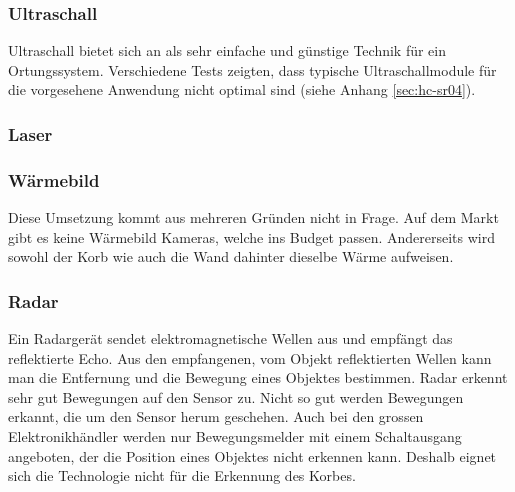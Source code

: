 \subsubsection{Ultraschall}
Ultraschall bietet sich an als sehr einfache und günstige Technik für ein Ortungssystem.
Verschiedene Tests zeigten, dass typische Ultraschallmodule für die vorgesehene Anwendung
nicht optimal sind (siehe Anhang \ref{sec:hc-sr04}).

\subsubsection{Laser}


\subsubsection{Wärmebild}
Diese Umsetzung kommt aus mehreren Gründen nicht in Frage. Auf dem Markt gibt es keine Wärmebild Kameras, welche ins Budget passen. Andererseits wird sowohl der Korb wie auch die Wand dahinter dieselbe Wärme aufweisen.

\subsubsection{Radar}

Ein Radargerät sendet elektromagnetische Wellen aus und empfängt das reflektierte Echo. Aus den empfangenen, vom Objekt reflektierten Wellen kann man die Entfernung und die Bewegung eines Objektes bestimmen. Radar erkennt sehr gut Bewegungen auf den Sensor zu. Nicht so gut werden Bewegungen erkannt, die um den Sensor herum geschehen. Auch bei den grossen Elektronikhändler werden nur Bewegungsmelder mit einem Schaltausgang angeboten, der die Position eines Objektes nicht erkennen kann. Deshalb eignet sich die Technologie nicht für die Erkennung des Korbes.
